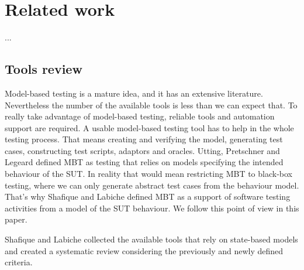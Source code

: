 \chapter{Related work}
\label{cha:relatedwork}

...

\section{Tools review}
\label{sec:toolsreview}

Model-based testing is a mature idea, and it has an extensive literature. Nevertheless the number of the available tools is less than we can expect that. To really take advantage of model-based testing, reliable tools and automation support are required. A usable model-based testing tool has to help in the whole testing process. That means creating and verifying the model, generating test cases, constructing test scripts, adaptors and oracles. Utting, Pretschner and Legeard \cite{taxonomy} defined MBT as testing that relies on models specifying the intended behaviour of the SUT. In reality that would mean restricting MBT to black-box testing, where we can only generate abstract test cases from the behaviour model. That's why Shafique and Labiche defined MBT as a support of software testing activities from a model of the SUT behaviour. We follow this point of view in this paper.

Shafique and Labiche \cite{toolsreview} collected the available tools that rely on state-based models and created a systematic review considering the previously and newly defined criteria.

